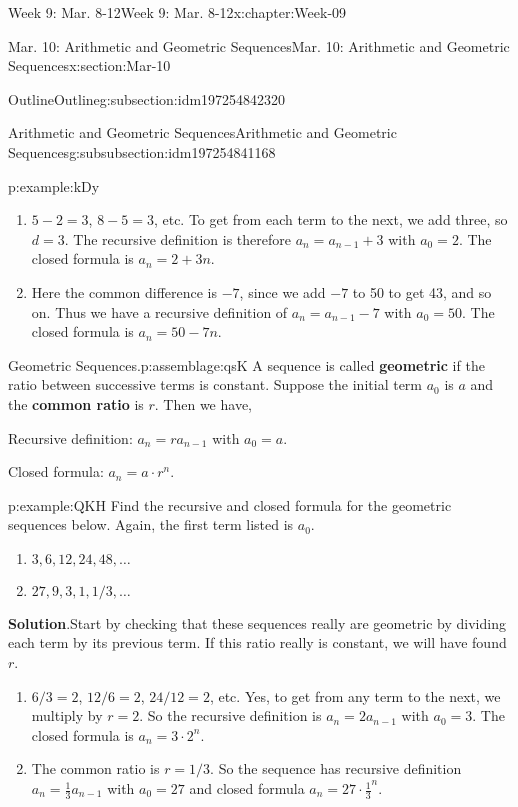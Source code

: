 \documentclass[oneside,10pt,]{book}
\newcommand{\blocktitlefont}{\relax}
\newcommand{\terminology}[1]{\textbf{#1}}
\numberwithin{equation}{section}
\begin{document}
\begin{chapterptx}{Week 9: Mar. 8-12}{}{Week 9: Mar. 8-12}{}{}{x:chapter:Week-09}
\begin{sectionptx}{Mar. 10: Arithmetic and Geometric Sequences}{}{Mar. 10: Arithmetic and Geometric Sequences}{}{}{x:section:Mar-10}
\begin{subsectionptx}{Outline}{}{Outline}{}{}{g:subsection:idm197254842320}
\begin{subsubsectionptx}{Arithmetic and Geometric Sequences}{}{Arithmetic and Geometric Sequences}{}{}{g:subsubsection:idm197254841168}
\begin{example}{}{p:example:kDy}
\par
%
\begin{enumerate}
\item{}\(5-2 = 3\), \(8-5 = 3\), etc. To get from each term to the next, we add three, so \(d = 3\). The recursive definition is therefore \(a_n = a_{n-1} + 3\) with \(a_0 = 2\). The closed formula is \(a_n = 2 + 3n\).%
\item{}Here the common difference is \(-7\), since we add \(-7\) to 50 to get 43, and so on. Thus we have a recursive definition of \(a_n = a_{n-1} - 7\) with \(a_0 = 50\). The closed formula is \(a_n = 50 - 7n\).%
\end{enumerate}
%
\end{example}
\begin{assemblage}{Geometric Sequences.}{p:assemblage:qsK}%
A sequence is called \terminology{geometric} if the ratio between successive terms is constant. Suppose the initial term \(a_0\) is \(a\) and the \terminology{common ratio} is \(r\). Then we have,%
\par
Recursive definition: \(a_n = ra_{n-1}\) with \(a_0 = a\).%
\par
Closed formula: \(a_n = a\cdot r^{n}\).%
\end{assemblage}
\begin{example}{}{p:example:QKH}%
Find the recursive and closed formula for the geometric sequences below. Again, the first term listed is \(a_0\).%
\begin{enumerate}
\item{}\(\displaystyle 3, 6, 12, 24, 48, \ldots\)%
\item{}\(\displaystyle 27, 9, 3, 1, 1/3, \ldots\)%
\end{enumerate}
%
\par\smallskip%
\noindent\textbf{\blocktitlefont Solution}.\hypertarget{p:solution:NQb}{}\quad{}Start by checking that these sequences really are geometric by dividing each term by its previous term. If this ratio really is constant, we will have found \(r\).%
\begin{enumerate}
\item{}\(6/3 = 2\), \(12/6 = 2\), \(24/12 = 2\), etc. Yes, to get from any term to the next, we multiply by \(r = 2\). So the recursive definition is \(a_n = 2a_{n-1}\) with \(a_0 = 3\). The closed formula is \(a_n = 3\cdot 2^{n}\).%
\item{}The common ratio is \(r = 1/3\). So the sequence has recursive definition \(a_n = \frac{1}{3}a_{n-1}\) with \(a_0 = 27\) and closed formula \(a_n = 27\cdot \frac{1}{3}^{n}\).%

\end{enumerate}
\end{example}
\end{subsubsectionptx}
\end{subsectionptx}
\end{sectionptx}
\end{chapterptx}
\end{document}
